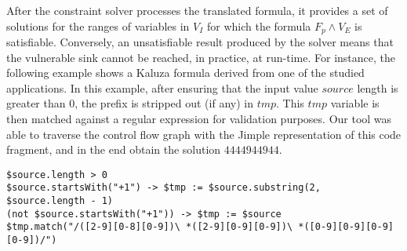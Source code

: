 After the constraint solver processes the translated formula, it provides a set of solutions for the ranges of variables in $V_I$ for which the formula $F_p \wedge V_E$ is satisfiable. Conversely, an unsatisfiable result produced by the solver means that the vulnerable sink cannot be reached, in practice, at run-time. For instance, the following example shows a Kaluza formula derived from one of the studied applications. In this example, after ensuring that the input value $source$ length is greater than 0, the prefix is stripped out (if any) in $tmp$. This $tmp$ variable is then matched against a regular expression for validation purposes. Our tool was able to traverse the control flow graph with the Jimple representation of this code fragment, and in the end obtain the solution $444494 4944$.
\lstset{numbers=left,xleftmargin=1cm, basicstyle=\ttfamily\scriptsize, breaklines=true}
\begin{lstlisting}
$source.length > 0
$source.startsWith("+1") -> $tmp := $source.substring(2, $source.length - 1)
(not $source.startsWith("+1")) -> $tmp := $source
$tmp.match("/([2-9][0-8][0-9])\ *([2-9][0-9][0-9])\ *([0-9][0-9][0-9][0-9])/")
\end{lstlisting}


